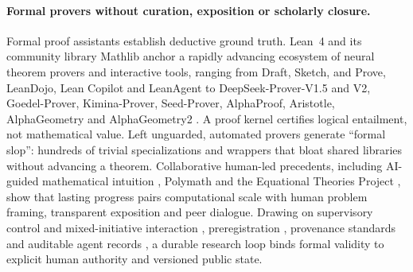 \documentclass[11pt,a4paper]{article}
\begin{document}
\paragraph{Formal provers without curation, exposition or scholarly closure.}
Formal proof assistants establish deductive ground truth. Lean~4 and its
community library Mathlib \citep{lean4,mathlib} anchor a rapidly advancing
ecosystem of neural theorem provers and interactive tools, ranging from Draft,
Sketch, and Prove, LeanDojo, Lean Copilot and LeanAgent
\citep{dsp,leandojo,leancopilot,leanagent} to DeepSeek-Prover-V1.5 and V2,
Goedel-Prover, Kimina-Prover, Seed-Prover, AlphaProof, Aristotle,
AlphaGeometry and AlphaGeometry2
\citep{deepseekprover15,deepseekprover2,goedel,kimina,seedprover,alphaproof,aristotle,alphageometry,alphageometry2}.
A proof kernel certifies logical entailment, not mathematical value. Left
unguarded, automated provers generate ``formal slop'': hundreds of trivial
specializations and wrappers that bloat shared libraries without advancing a
theorem. Collaborative human-led precedents, including AI-guided mathematical
intuition \citep{davies,georgiev}, Polymath \citep{polymath} and the Equational
Theories Project \citep{etp}, show that lasting progress pairs computational
scale with human problem framing, transparent exposition and peer dialogue.
Drawing on supervisory control and mixed-initiative interaction
\citep{sheridan,parasuraman,horvitz,amershi}, preregistration \citep{nosek},
provenance standards \citep{prov,fair} and auditable agent records
\citep{symposium,verifiedlab,openai4s}, a durable research loop binds formal
validity to explicit human authority and versioned public state.
\end{document}
